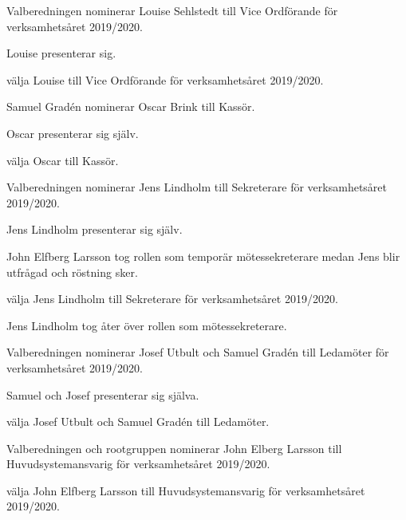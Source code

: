 \documentclass{protokoll}
\begin{document}
Valberedningen nominerar Louise Sehlstedt till Vice Ordförande för verksamhetsåret 2019/2020.

Louise presenterar sig.
\begin{beslut}
  \att välja Louise till Vice Ordförande för verksamhetsåret 2019/2020.
\end{beslut}

Samuel Gradén nominerar Oscar Brink till Kassör. 

Oscar presenterar sig själv.

\begin{beslut}
  \att välja Oscar till Kassör.
\end{beslut}

Valberedningen nominerar Jens Lindholm till Sekreterare för verksamhetsåret 2019/2020.

Jens Lindholm presenterar sig själv.

John Elfberg Larsson tog rollen som temporär mötessekreterare medan Jens blir
utfrågad och röstning sker.


\begin{beslut}
  \att välja Jens Lindholm till Sekreterare för verksamhetsåret 2019/2020.
\end{beslut}

Jens Lindholm tog åter över rollen som mötessekreterare.

Valberedningen nominerar Josef Utbult och Samuel Gradén till Ledamöter för 
verksamhetsåret 2019/2020.

Samuel och Josef presenterar sig själva.

\begin{beslut}
  \att välja Josef Utbult och Samuel Gradén till Ledamöter.
\end{beslut}

Valberedningen och rootgruppen nominerar John Elberg Larsson till
Huvudsystemansvarig för verksamhetsåret 2019/2020.

\begin{beslut}
  \att välja John Elfberg Larsson till Huvudsystemansvarig för verksamhetsåret 
  2019/2020.
\end{beslut}
\end{document}
